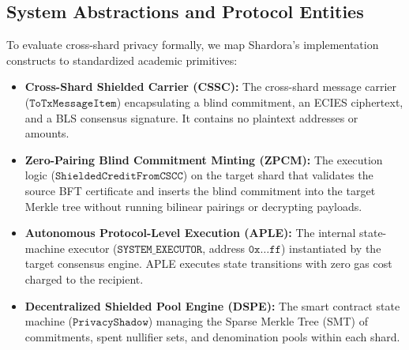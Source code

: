 \documentclass[sigconf,nonacm]{acmart}
\begin{document}
\subsection{System Abstractions and Protocol Entities}
To evaluate cross-shard privacy formally, we map Shardora's implementation constructs to standardized academic primitives:
\begin{itemize}
    \item \textbf{Cross-Shard Shielded Carrier (CSSC):} The cross-shard message carrier ($\mathtt{ToTxMessageItem}$) encapsulating a blind commitment, an ECIES ciphertext, and a BLS consensus signature. It contains no plaintext addresses or amounts.
    \item \textbf{Zero-Pairing Blind Commitment Minting (ZPCM):} The execution logic ($\mathtt{ShieldedCreditFromCSCC}$) on the target shard that validates the source BFT certificate and inserts the blind commitment into the target Merkle tree without running bilinear pairings or decrypting payloads.
    \item \textbf{Autonomous Protocol-Level Execution (APLE):} The internal state-machine executor ($\mathtt{SYSTEM\_EXECUTOR}$, address $\mathtt{0x\ldots ff}$) instantiated by the target consensus engine. APLE executes state transitions with zero gas cost charged to the recipient.
    \item \textbf{Decentralized Shielded Pool Engine (DSPE):} The smart contract state machine ($\mathtt{PrivacyShadow}$) managing the Sparse Merkle Tree (SMT) of commitments, spent nullifier sets, and denomination pools within each shard.
\end{itemize}
\end{document}
